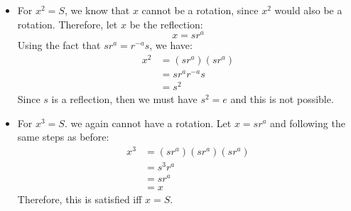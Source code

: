 \begin{sol}
    \begin{itemize}
        \item For $x^2=S$, we know that $x$ cannot be a rotation, since $x^2$ would also be a rotation. Therefore, let $x$ be the reflection:
        \begin{equation}
            x = sr^{a}
        \end{equation}
        Using the fact that $sr^{a} = r^{-a}s$, we have:
        \begin{align}
            x^2 &= (sr^{a})(sr^{a}) \\ 
            &= sr^{a}r^{-a}s \\ 
            &= s^2
        \end{align}
        Since $s$ is a reflection, then we must have $s^2=e$ and this is not possible.
        \item For $x^3=S$. we again cannot have a rotation. Let $x=sr^{a}$ and following the same steps as before:
        \begin{align}
            x^3 &= (sr^{a})(sr^{a})(sr^{a}) \\ 
            &= s^3r^{a} \\ 
            &= sr^{a} \\ 
            &= x
        \end{align}
        Therefore, this is satisfied iff $x=S$.
    \end{itemize}
\end{sol}
